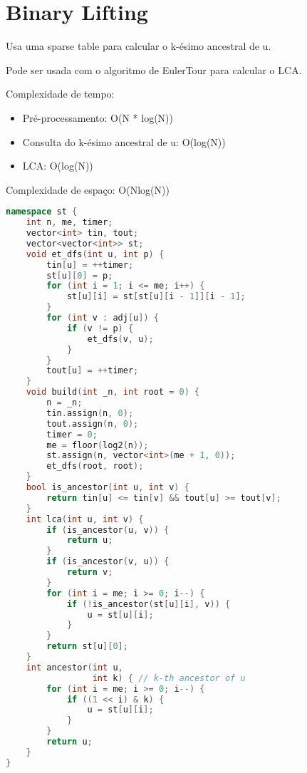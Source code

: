 \documentclass[11pt, a4paper, oneside]{book}
\begin{document}
\hfill

\section{Binary Lifting}


Usa uma sparse table para calcular o k-ésimo ancestral de u.



Pode ser usada com o algoritmo de EulerTour para calcular o LCA.



Complexidade de tempo:



\begin{itemize}
\item Pré-processamento: O(N * log(N))
\item Consulta do k-ésimo ancestral de u: O(log(N))
\item LCA: O(log(N))
\end{itemize}



Complexidade de espaço: O(Nlog(N))

\hfill

\begin{multicols}{2}
\begin{lstlisting}[language=C++]
namespace st {
    int n, me, timer;
    vector<int> tin, tout;
    vector<vector<int>> st;
    void et_dfs(int u, int p) {
        tin[u] = ++timer;
        st[u][0] = p;
        for (int i = 1; i <= me; i++) {
            st[u][i] = st[st[u][i - 1]][i - 1];
        }
        for (int v : adj[u]) {
            if (v != p) {
                et_dfs(v, u);
            }
        }
        tout[u] = ++timer;
    }
    void build(int _n, int root = 0) {
        n = _n;
        tin.assign(n, 0);
        tout.assign(n, 0);
        timer = 0;
        me = floor(log2(n));
        st.assign(n, vector<int>(me + 1, 0));
        et_dfs(root, root);
    }
    bool is_ancestor(int u, int v) {
        return tin[u] <= tin[v] && tout[u] >= tout[v];
    }
    int lca(int u, int v) {
        if (is_ancestor(u, v)) {
            return u;
        }
        if (is_ancestor(v, u)) {
            return v;
        }
        for (int i = me; i >= 0; i--) {
            if (!is_ancestor(st[u][i], v)) {
                u = st[u][i];
            }
        }
        return st[u][0];
    }
    int ancestor(int u,
                 int k) { // k-th ancestor of u
        for (int i = me; i >= 0; i--) {
            if ((1 << i) & k) {
                u = st[u][i];
            }
        }
        return u;
    }
}
\end{lstlisting}
\end{multicols}
\end{document}
